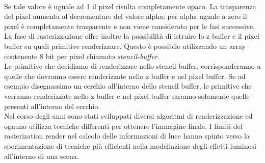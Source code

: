 \\
Se tale valore è uguale ad 1 il pixel risulta completamente opaco. La trasparenza del pixel aumenta al decrementare del valore alpha; per alpha uguale a zero il pixel è completamente trasparente e non viene considerato per le fasi successive.
\\
La fase di rasterizzazione offre inoltre la possibilità di istruire lo z buffer e il pixel buffer su quali primitive renderizzare. Questo è possibile utilizzando un array contenente 8 bit per pixel chiamato \emph{stencil-buffer}. 
\\
Le primitive che decidiamo di renderizzare nello stencil buffer, corrisponderanno a quelle che dovranno essere renderizzate nello z buffer e nel pixel buffer. Se ad esempio disegnassimo un cerchio all’interno dello stencil buffer, le primitive che verranno renderizzate nello z buffer e nel pixel buffer saranno solamente quelle presenti all’interno del cerchio.
\\
Nel corso degli anni sono stati sviluppati diversi algoritmi di renderizzazione ed ognuno utilizza tecniche differenti per ottenere l’immagine finale. I limiti del rasterization render nel calcolo delle informazioni di luce hanno spinto verso la sperimentazione di tecniche più efficienti nella modellazione degli effetti luminosi all’interno di una scena.